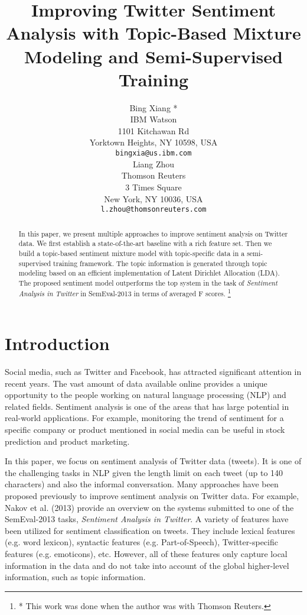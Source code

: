 \documentclass[11pt]{article}
\title{Improving Twitter Sentiment Analysis with Topic-Based Mixture Modeling and Semi-Supervised Training}
\author{Bing Xiang *\\
  IBM Watson \\
  1101 Kitchawan Rd \\
  Yorktown Heights, NY 10598, USA \\
  {\tt bingxia@us.ibm.com} \\\And
  Liang Zhou \\
  Thomson Reuters \\
  3 Times Square \\
  New York, NY 10036, USA \\
  {\tt l.zhou@thomsonreuters.com} \\}
\date{}
\begin{document}
\maketitle
\begin{abstract}
  In this paper, we present multiple approaches to improve sentiment analysis on Twitter data.
  We first establish a state-of-the-art baseline with a rich feature set. Then we build a topic-based sentiment
  mixture model with topic-specific data in a semi-supervised training framework. The topic information
  is generated through topic modeling based on an efficient implementation of Latent Dirichlet Allocation (LDA).
  The proposed sentiment model outperforms the top system in the task of
  \textit{Sentiment Analysis in Twitter} in SemEval-2013 in terms of averaged F scores.
\let\thefootnote\relax\footnote{* This work was done when the author was with Thomson Reuters.}
\end{abstract}

\section{Introduction}

Social media, such as Twitter and Facebook, has attracted significant attention in recent years.
The vast amount of data available online provides a unique opportunity to the people working on natural 
language processing (NLP) and related fields. Sentiment analysis is one of the areas that has large potential
in real-world applications. For example, monitoring the trend of sentiment 
for a specific company or product mentioned in social media can be useful in stock prediction and product marketing.

In this paper, we focus on sentiment analysis of Twitter data (tweets). It is one of the 
challenging tasks in NLP given the length limit on each tweet (up to 140 characters) and also
the informal conversation. Many approaches have been proposed previously to improve sentiment
analysis on Twitter data. For example, Nakov et al. (2013) provide an overview on the systems
submitted to one of the SemEval-2013 tasks, \textit{Sentiment Analysis in Twitter}. A variety of
features have been utilized for sentiment classification on tweets. They include lexical features (e.g. word lexicon),
syntactic features (e.g. Part-of-Speech), Twitter-specific features (e.g. emoticons), etc.
However, all of these features only capture local information in the data and do not take into
account of the global higher-level information, such as topic information. 
\end{document}
